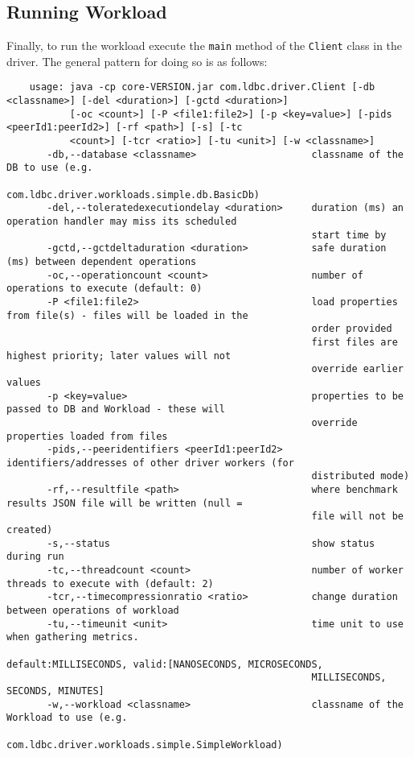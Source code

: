 \subsection{Running Workload}
\label{sub:running_workload}

Finally, to run the workload execute the \texttt{main} method of the \texttt{Client} class in the driver.
The general pattern for doing so is as follows:

{\footnotesize
	\begin{verbatim}
	usage: java -cp core-VERSION.jar com.ldbc.driver.Client [-db <classname>] [-del <duration>] [-gctd <duration>]
	       [-oc <count>] [-P <file1:file2>] [-p <key=value>] [-pids <peerId1:peerId2>] [-rf <path>] [-s] [-tc
	       <count>] [-tcr <ratio>] [-tu <unit>] [-w <classname>]
	   -db,--database <classname>                    classname of the DB to use (e.g.
	                                                 com.ldbc.driver.workloads.simple.db.BasicDb)
	   -del,--toleratedexecutiondelay <duration>     duration (ms) an operation handler may miss its scheduled
	                                                 start time by
	   -gctd,--gctdeltaduration <duration>           safe duration (ms) between dependent operations
	   -oc,--operationcount <count>                  number of operations to execute (default: 0)
	   -P <file1:file2>                              load properties from file(s) - files will be loaded in the
	                                                 order provided
	                                                 first files are highest priority; later values will not
	                                                 override earlier values
	   -p <key=value>                                properties to be passed to DB and Workload - these will
	                                                 override properties loaded from files
	   -pids,--peeridentifiers <peerId1:peerId2>     identifiers/addresses of other driver workers (for
	                                                 distributed mode)
	   -rf,--resultfile <path>                       where benchmark results JSON file will be written (null =
	                                                 file will not be created)
	   -s,--status                                   show status during run
	   -tc,--threadcount <count>                     number of worker threads to execute with (default: 2)
	   -tcr,--timecompressionratio <ratio>           change duration between operations of workload
	   -tu,--timeunit <unit>                         time unit to use when gathering metrics.
	                                                 default:MILLISECONDS, valid:[NANOSECONDS, MICROSECONDS,
	                                                 MILLISECONDS, SECONDS, MINUTES]
	   -w,--workload <classname>                     classname of the Workload to use (e.g.
	                                                 com.ldbc.driver.workloads.simple.SimpleWorkload)
	\end{verbatim}
}

